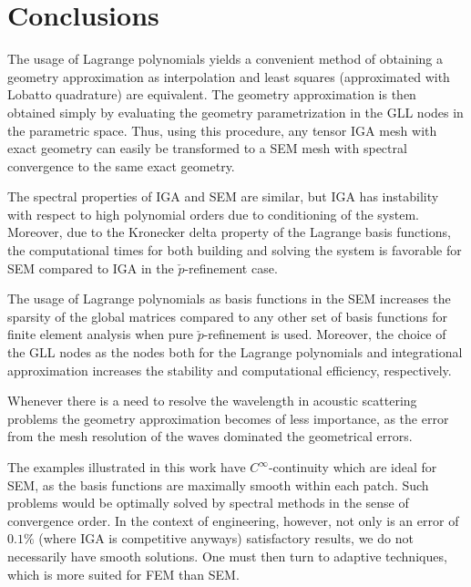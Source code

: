 \section{Conclusions}
The usage of Lagrange polynomials yields a convenient method of obtaining a geometry approximation as interpolation and least squares (approximated with Lobatto quadrature) are equivalent. The geometry approximation is then obtained simply by evaluating the geometry parametrization in the GLL nodes in the parametric space. Thus, using this procedure, any tensor IGA mesh with exact geometry can easily be transformed to a SEM mesh with spectral convergence to the same exact geometry. 

The spectral properties of IGA and SEM are similar, but IGA has instability with respect to high polynomial orders due to conditioning of the system. Moreover, due to the Kronecker delta property of the Lagrange basis functions, the computational times for both building and solving the system is favorable for SEM compared to IGA in the $\check{p}$-refinement case.

The usage of Lagrange polynomials as basis functions in the SEM increases the sparsity of the global matrices compared to any other set of basis functions for finite element analysis when pure $\check{p}$-refinement is used. Moreover, the choice of the GLL nodes as the nodes both for the Lagrange polynomials and integrational approximation increases the stability and computational efficiency, respectively. 

Whenever there is a need to resolve the wavelength in acoustic scattering problems the geometry approximation becomes of less importance, as the error from the mesh resolution of the waves dominated the geometrical errors.

The examples illustrated in this work have $C^\infty$-continuity which are ideal for SEM, as the basis functions are maximally smooth within each patch. Such problems would be optimally solved by spectral methods in the sense of convergence order. In the context of engineering, however, not only is an error of $0.1\%$ (where IGA is competitive anyways) satisfactory results, we do not necessarily have smooth solutions. One must then turn to adaptive techniques, which is more suited for FEM than SEM.